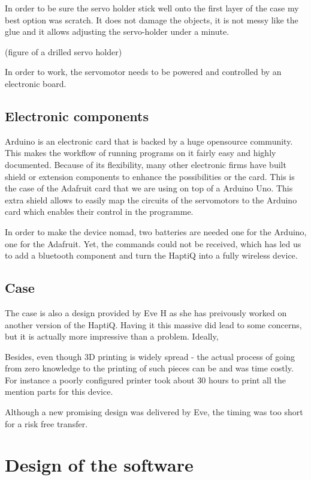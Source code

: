 In order to be sure the servo holder stick well onto the first layer of
the case my best option was scratch. It does not damage the objects, it
is not messy like the glue and it allows adjusting the servo-holder
under a minute.

(figure of a drilled servo holder)

In order to work, the servomotor needs to be powered and controlled by
an electronic board.

\subsection{Electronic components}\label{electronic-components}

Arduino is an electronic card that is backed by a huge opensource
community. This makes the workflow of running programs on it fairly easy
and highly documented. Because of its flexibility, many other electronic
firms have built shield or extension components to enhance the
possibilities or the card. This is the case of the Adafruit card that we
are using on top of a Arduino Uno. This extra shield allows to easily
map the circuits of the servomotors to the Arduino card which enables
their control in the programme.

In order to make the device nomad, two batteries are needed one for the
Arduino, one for the Adafruit. Yet, the commands could not be received,
which has led us to add a bluetooth component and turn the HaptiQ into a
fully wireless device.

\subsection{Case}\label{case}

The case is also a design provided by Eve H as she has preivously worked
on another version of the HaptiQ. Having it this massive did lead to
some concerns, but it is actually more impressive than a problem.
Ideally,

Besides, even though 3D printing is widely spread - the actual process
of going from zero knowledge to the printing of such pieces can be and
was time costly. For instance a poorly configured printer took about 30
hours to print all the mention parts for this device.

Although a new promising design was delivered by Eve, the timing was too
short for a risk free transfer.

\section{Design of the software}\label{design-of-the-software}


